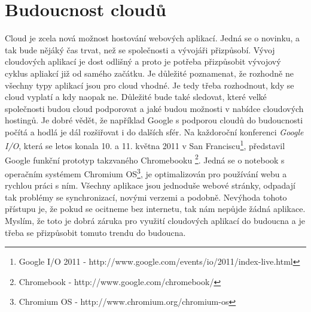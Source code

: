 \section{Budoucnost cloudů}
Cloud je zcela nová možnost hostování webových aplikací. Jedná se o novinku, a tak bude nějáký čas trvat, než se společnosti a vývojáři přizpůsobí. Vývoj cloudových aplikací je dost odlišný a proto je potřeba přizpůsobit vývojový cyklus apliakcí již od samého začátku. Je důležité poznamenat, že rozhodně ne všechny typy aplikací jsou pro cloud vhodné. Je tedy třeba rozhodnout, kdy se cloud vyplatí a kdy naopak ne. Důležité bude také sledovat, které velké společnosti budou cloud podporovat a jaké budou možnosti v nabídce cloudových hostingů. Je dobré vědět, že například Google s podporou cloudů do budoucnosti počítá a hodlá je dál rozšiřovat i do dalších sfér. Na každoroční konferenci \emph{Google I/O}, která se letos konala 10. a 11. května 2011 v San Franciscu\footnote{Google I/O 2011 - http://www.google.com/events/io/2011/index-live.html}, představil Google funkční prototyp takzvaného Chromebooku \footnote{Chromebook - http://www.google.com/chromebook/}. Jedná se o notebook s operačním systémem Chromium OS\footnote{Chromium OS - http://www.chromium.org/chromium-os}, je optimalizován pro používání webu a rychlou práci s ním. Všechny aplikace jsou jednoduše webové stránky, odpadají tak problémy se synchronizací, novými verzemi a podobně. Nevýhoda tohoto přístupu je, že pokud se ocitneme bez internetu, tak nám nepůjde žádná aplikace. Myslím, že toto je dobrá záruka pro využití cloudových aplikací do budoucna a je třeba se přizpůsobit tomuto trendu do budoucna.
